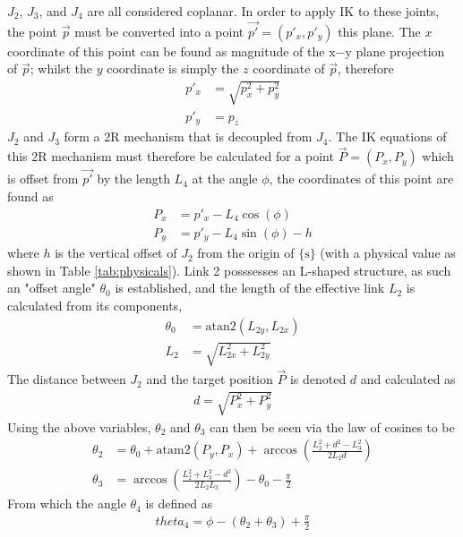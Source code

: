 \documentclass[a4paper,11pt]{article}
\begin{document}
$J_{2}$, $J_{3}$, and $J_{4}$ are all considered coplanar. In order to apply IK to these joints, the point $\vec{p}$ must be converted into a point $\vec{p'} = (p'_{x}, p'_{y})$ this plane. The $x$ coordinate of this point can be found as magnitude of the $\mathrm{x}\mathrm{-}\mathrm{y}$ plane projection of $\vec{p}$; whilst the $y$ coordinate is simply the $z$ coordinate of $\vec{p}$, therefore
\begin{align*}
    p'_{x} &= \sqrt{ p_{x}^2 + p_{y}^2 } \\
    p'_{y} &= p_{z}
\end{align*}
$J_{2}$ and $J_{3}$ form a 2R mechanism that is decoupled from $J_{4}$. The IK equations of this 2R mechanism must therefore be calculated for a point $\vec{P} = (P_{x}, P_{y})$ which is offset from $\vec{p'}$ by the length $L_{4}$ at the angle $\phi$, the coordinates of this point are found as
\begin{align*}
    P_{x} &= p'_{x} - L_{4}\cos(\phi) \\
    P_{y} &= p'_{y} - L_{4}\sin(\phi) - h
\end{align*}
where $h$ is the vertical offset of $J_{2}$ from the origin of $\{\mathrm{s}\}$ (with a physical value as shown in Table \ref{tab:physicals}). Link 2 posssesses an L-shaped structure, as such an "offset angle" $\theta_{0}$ is established, and the length of the effective link $L_{2}$ is calculated from its components,
\begin{align*}
    \theta_0 &= \mathrm{atan2}(L_{2y}, L_{2x}) \\
    L_{2} &= \sqrt{ L_{2x}^2 + L_{2y}^2 }
\end{align*}
The distance between $J_2$ and the target position $\vec{P}$ is denoted $d$ and calculated as
\begin{align*}
    d = \sqrt{P_{x}^2 + P_{y}^2}
\end{align*}
Using the above variables, $\theta_{2}$ and $\theta_{3}$ can then be seen via the law of cosines to be
\begin{align}
    \theta_{2} &= \theta_{0} + \mathrm{atam2}(P_{y}, P_{x}) + \arccos \left( \frac{L_{2}^2 + d^2 - L_{3}^2}{2L_{2}d} \right) \nonumber \\
    \theta_{3} &= \arccos \left( \frac{L_{2}^2 + L_{3}^2 - d^2}{2L_{2}L_{3}} \right) - \theta_{0} - \frac{\pi}{2}
    \label{eq:theta_2_and_3}
\end{align}
From which the angle $\theta_{4}$ is defined as
\begin{align}
    theta_{4} = \phi - (\theta_{2} + \theta_{3}) + \frac{\pi}{2}
    \label{eq:theta_4}
\end{align}
\end{document}

